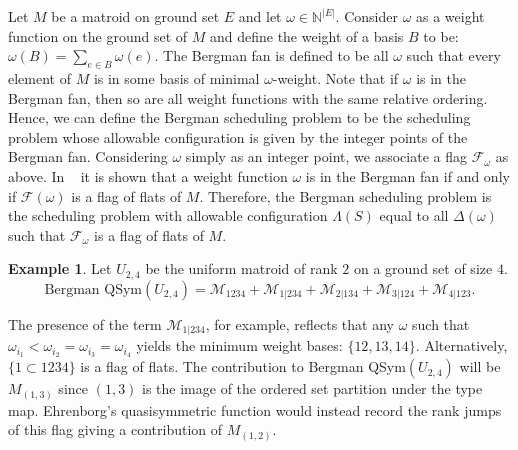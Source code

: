 \documentclass[12pt,reqno]{amsart}
\numberwithin{definition}{section}
\theoremstyle{definition}
\newtheorem{example}[definition]{Example}
\newcommand{\om}{\omega}
\newcommand{\ncM}{\mathcal{M}}
\newcommand{\allow}{\Lambda} %
\begin{document}
Let $M$ be a matroid on ground set $E$ and let $\omega \in
\mathbb{N}^{|E|}$.  Consider $\omega$ as a weight function on the ground
set of $M$ and define the weight of a basis $B$ to be: $\omega(B) =
\sum_{e\in B} \omega(e)$.  The Bergman fan is defined to be  all
$\omega$ such that every element of $M$ is in some basis of minimal $\omega$-weight.  Note that if $\omega$ is in the Bergman fan, then so are all
weight functions with the same relative ordering.  Hence, we can
define the Bergman scheduling problem to be the scheduling problem
whose allowable configuration is given by the integer points of the
Bergman fan.
  Considering $\omega$ simply as an integer
  point, we associate a flag $\mathscr{F}_{\omega}$ as above.
In ~\cite{AK} it is shown that a weight function $\omega$ is  in the Bergman fan
if and only if $\mathscr{F}(\om)$ is a flag of flats of $M$.
Therefore, the Bergman scheduling problem is the scheduling problem with allowable configuration $\allow(S)$ equal to all $\Delta(\om)$ such that $\mathcal{F}_{\omega}$ is a flag of flats of $M$. 


\begin{example}

Let $U_{2,4}$ be the uniform matroid of rank $2$ on a ground set of
size $4$.  
$$\textrm{Bergman QSym}(U_{2,4})  = {\ncM}_{1234} + {\ncM}_{1|234} + {\ncM}_{2|134} + {\ncM}_{3|124} + {\ncM}_{4|123}. $$

The presence of the term ${\ncM}_{1|234}$, for example, reflects that any $\omega$ such that $\omega_{i_1} < \omega_{i_2} =
\omega_{i_3} = \omega_{i_4}$ yields the minimum weight bases:
$\{12,13,14\}$.  Alternatively, $\{ 1 \subset 1234\}$ is a flag of
flats.  The contribution to Bergman QSym$(U_{2,4})$ will be $M_{(1,3)}$ since $(1,3)$
is the image of the ordered set partition under the type map.
Ehrenborg's quasisymmetric function would instead record the rank jumps of this flag giving a contribution of $M_{(1,2)}$.


\end{example}
\end{document}
